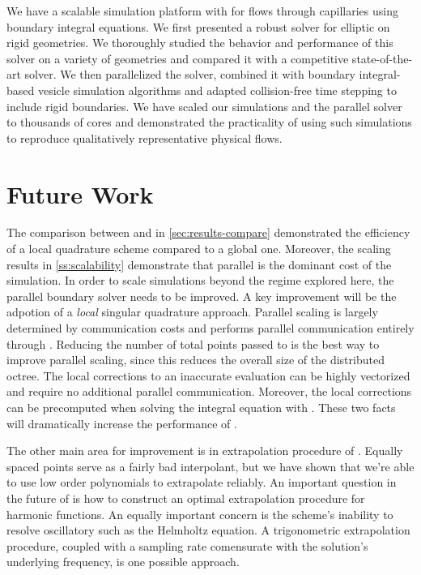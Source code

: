 
We have a scalable simulation platform with for \rbc flows through capillaries using boundary integral equations. 
We first presented a robust solver for elliptic \pdes on \threed rigid geometries. 
We thoroughly studied the behavior and performance of this solver on a variety of geometries and compared it with a competitive state-of-the-art solver.
We then parallelized the solver, combined it with boundary integral-based vesicle simulation algorithms and adapted collision-free time stepping to include rigid boundaries.
We have scaled our simulations and the parallel solver to thousands of cores and demonstrated the practicality of using such simulations to reproduce qualitatively representative physical \rbcs flows.

\section{Future Work}
The comparison between \qbkix and \cite{YBZ} in \cref{sec:results-compare} demonstrated the efficiency of a local quadrature scheme compared to a global one. 
Moreover, the scaling results in \cref{ss:scalability} demonstrate that parallel \qbkix is the dominant cost of the simulation.
In order to scale \rbc simulations beyond the regime explored here, the parallel boundary solver needs to be improved. 
A key improvement will be the adpotion of a \textit{local} singular quadrature approach.
Parallel scaling is largely determined by communication costs and \qbkix performs parallel communication entirely through \pvfmm. 
Reducing the number of total points passed to \pvfmm is the best way to improve parallel scaling, since this reduces the overall size of the distributed octree.
The local corrections to an inaccurate \fmm evaluation can be highly vectorized and require no additional parallel communication.
Moreover, the local corrections can be precomputed when solving the integral equation with \gmres. 
These two facts will dramatically increase the performance of \qbkix.

The other main area for improvement is in extrapolation procedure of \qbkix. 
Equally spaced points serve as a fairly bad interpolant, but we have shown that we're able to use low order polynomials to extrapolate reliably.
An important question in the future of \qbkix is how to construct an optimal \oned extrapolation procedure for harmonic functions.
An equally important concern is the scheme's inability to resolve oscillatory \pdes such as the Helmholtz equation.
A trigonometric extrapolation procedure, coupled with a sampling rate comensurate with the solution's underlying frequency, is one possible approach.

